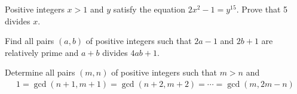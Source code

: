 \documentclass{subfile}
\begin{document}
	\begin{problem}
		Positive integers $x>1$ and $y$ satisfy the equation $2x^2-1=y^{15}$. Prove that 5 divides $x$. %
	\end{problem}


	\begin{problem}
		Find all pairs $(a,b)$ of positive integers such that $2a-1$ and $2b+1$ are relatively prime and $a+b$ divides $4ab+1.$ %
	\end{problem}




	\begin{problem}
		Determine all pairs $(m, n)$ of positive integers such that $m>n$ and
			\begin{align*}
				1 = \gcd(n+1,m+1) = \gcd(n+2,m+2) = \cdots = \gcd(m,2m-n)
			\end{align*}
	\end{problem}
\end{document}
